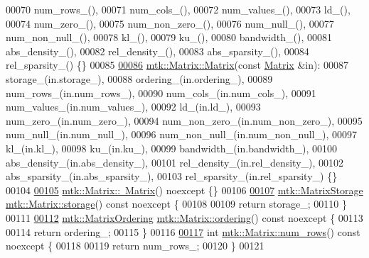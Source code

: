\begin{DoxyCode}
00070   num\_rows\_(),
00071   num\_cols\_(),
00072   num\_values\_(),
00073   ld\_(),
00074   num\_zero\_(),
00075   num\_non\_zero\_(),
00076   num\_null\_(),
00077   num\_non\_null\_(),
00078   kl\_(),
00079   ku\_(),
00080   bandwidth\_(),
00081   abs\_density\_(),
00082   rel\_density\_(),
00083   abs\_sparsity\_(),
00084   rel\_sparsity\_() \{\}
00085 
\hypertarget{mtk__matrix_8cc_source_l00086}{}\hyperlink{classmtk_1_1Matrix_ae532878cf9b34114f12a1f06701482aa}{00086} \hyperlink{classmtk_1_1Matrix_a04b8575764d3a649f21950c794f4cc02}{mtk::Matrix::Matrix}(\textcolor{keyword}{const} \hyperlink{classmtk_1_1Matrix}{Matrix} &in):
00087   storage\_(in.storage\_),
00088   ordering\_(in.ordering\_),
00089   num\_rows\_(in.num\_rows\_),
00090   num\_cols\_(in.num\_cols\_),
00091   num\_values\_(in.num\_values\_),
00092   ld\_(in.ld\_),
00093   num\_zero\_(in.num\_zero\_),
00094   num\_non\_zero\_(in.num\_non\_zero\_),
00095   num\_null\_(in.num\_null\_),
00096   num\_non\_null\_(in.num\_non\_null\_),
00097   kl\_(in.kl\_),
00098   ku\_(in.ku\_),
00099   bandwidth\_(in.bandwidth\_),
00100   abs\_density\_(in.abs\_density\_),
00101   rel\_density\_(in.rel\_density\_),
00102   abs\_sparsity\_(in.abs\_sparsity\_),
00103   rel\_sparsity\_(in.rel\_sparsity\_) \{\}
00104 
\hypertarget{mtk__matrix_8cc_source_l00105}{}\hyperlink{classmtk_1_1Matrix_a4e8dd5a0654121513421aaf584ef604e}{00105} \hyperlink{classmtk_1_1Matrix_a4e8dd5a0654121513421aaf584ef604e}{mtk::Matrix::~Matrix}() noexcept \{\}
00106 
\hypertarget{mtk__matrix_8cc_source_l00107}{}\hyperlink{classmtk_1_1Matrix_a9ffaa665a9cf7371b3be568415a08a3b}{00107} \hyperlink{group__c02-enums_ga25b67ec6a2afeee69f9bb196a9c66619}{mtk::MatrixStorage} \hyperlink{classmtk_1_1Matrix_a9ffaa665a9cf7371b3be568415a08a3b}{mtk::Matrix::storage}() const noexcept \{
00108 
00109   \textcolor{keywordflow}{return} storage\_;
00110 \}
00111 
\hypertarget{mtk__matrix_8cc_source_l00112}{}\hyperlink{classmtk_1_1Matrix_a13cd17621652cd5551ff98549bd94df7}{00112} \hyperlink{group__c02-enums_ga622801bd9f912d0f976c3e383f5f581c}{mtk::MatrixOrdering} \hyperlink{classmtk_1_1Matrix_a13cd17621652cd5551ff98549bd94df7}{mtk::Matrix::ordering}() const noexcept \{
00113 
00114   \textcolor{keywordflow}{return} ordering\_;
00115 \}
00116 
\hypertarget{mtk__matrix_8cc_source_l00117}{}\hyperlink{classmtk_1_1Matrix_ab308b25b48e4fcd39fc60e0c3fc66dea}{00117} \textcolor{keywordtype}{int} \hyperlink{classmtk_1_1Matrix_ab308b25b48e4fcd39fc60e0c3fc66dea}{mtk::Matrix::num\_rows}() const noexcept \{
00118 
00119   \textcolor{keywordflow}{return} num\_rows\_;
00120 \}
00121 

\end{DoxyCode}
